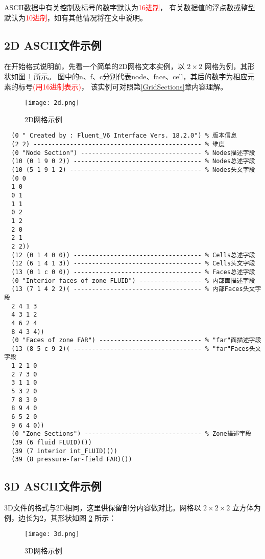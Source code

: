 \documentclass[lang=cn,11pt,a4paper]{elegantpaper} %
\begin{document}
ASCII数据中有关控制及标号的数字默认为\textcolor{red}{16进制}，
有关数据值的浮点数或整型默认为\textcolor{red}{10进制}，如有其他情况将在文中说明。

\subsection{2D ASCII文件示例}
在开始格式说明前，先看一个简单的2D网格文本实例，以 $2\times2$ 网格为例，其形状如图 \ref{2dMesh} 所示。
图中的n、f、c分别代表node、face、cell，其后的数字为相应元素的标号\textcolor{red}{(用16进制表示)}，
该实例可对照第\ref{GridSections}章内容理解。

\begin{figure}[!htb]
  \centering
  \texttt{[image: 2d.png]}
  \caption{2D网格示例}
  \label{2dMesh}
\end{figure}

\begin{lstlisting}
  (0 " Created by : Fluent_V6 Interface Vers. 18.2.0") % 版本信息
  (2 2) ---------------------------------------------- % 维度
  (0 "Node Section") --------------------------------- % Nodes描述字段
  (10 (0 1 9 0 2)) ----------------------------------- % Nodes总述字段
  (10 (5 1 9 1 2) ------------------------------------ % Nodes头文字段
  (0 0
  1 0
  0 1
  1 1
  0 2
  1 2
  2 0
  2 1
  2 2))
  (12 (0 1 4 0 0)) ----------------------------------- % Cells总述字段
  (12 (6 1 4 1 3)) ----------------------------------- % Cells头文字段
  (13 (0 1 c 0 0)) ----------------------------------- % Faces总述字段
  (0 "Interior faces of zone FLUID") ----------------- % 内部面描述字段
  (13 (7 1 4 2 2)( ----------------------------------- % 内部Faces头文字段
  2 4 1 3
  4 3 1 2
  4 6 2 4
  8 4 3 4))
  (0 "Faces of zone FAR") ---------------------------- % "far"面描述字段
  (13 (8 5 c 9 2)( ----------------------------------- % "far"Faces头文字段
  1 2 1 0
  2 7 3 0
  3 1 1 0
  5 3 2 0
  7 8 3 0
  8 9 4 0
  6 5 2 0
  9 6 4 0))
  (0 "Zone Sections") -------------------------------- % Zone描述字段
  (39 (6 fluid FLUID)())
  (39 (7 interior int_FLUID)())
  (39 (8 pressure-far-field FAR)()) 
\end{lstlisting}

\subsection{3D ASCII文件示例}

3D文件的格式与2D相同，这里供保留部分内容做对比。网格以 $2\times2\times2$ 立方体为例，边长为2，其形状如图 \ref{3dMesh} 所示：
\begin{figure}[!htb]
  \centering
  \texttt{[image: 3d.png]}
  \caption{3D网格示例}
  \label{3dMesh}
\end{figure}
\end{document}
